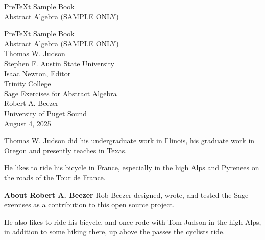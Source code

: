 \documentclass[oneside,10pt,]{book}
\newcommand{\titlepagefont}{\relax}
\numberwithin{equation}{section}
\begin{document}
\raggedbottom
\setcounter{page}{0}%
%
\frontmatter
\thispagestyle{empty}
{\titlepagefont\centering
\vspace*{0.28\textheight}
{\Huge PreTeXt Sample Book}\\[2\baselineskip]
{\LARGE Abstract Algebra (SAMPLE ONLY)}\\
}
\clearpage
\thispagestyle{empty}
{\titlepagefont\centering
\vspace*{0.14\textheight}
{\Huge PreTeXt Sample Book}\\[\baselineskip]
{\LARGE Abstract Algebra (SAMPLE ONLY)}\\[3\baselineskip]
{\Large Thomas W. Judson}\\[0.5\baselineskip]
{\Large Stephen F. Austin State University}\\[3\baselineskip]
{\Large Isaac Newton, Editor}\\[0.5\baselineskip]
{\Large Trinity College}\\[3\baselineskip]
{\Large Sage Exercises for Abstract Algebra}\\[0.5\baselineskip]
{\normalsize Robert A. Beezer}\\[0.25\baselineskip]
University of Puget Sound\\
[3\baselineskip]
{\Large August 4, 2025}\\}
\clearpage
\thispagestyle{empty}
\hypertarget{front-colophon}{}\noindent
Thomas W. Judson did his undergraduate work in Illinois, his graduate work in Oregon and presently teaches in Texas.%
\par
He likes to ride his bicycle in France, especially in the high Alps and Pyrenees on the roads of the Tour de France.%
\par
\bigskip\noindent\textbf{About Robert A. Beezer}\space\space
Rob Beezer designed, wrote, and tested the Sage exercises as a contribution to this open source project.%
\par
He also likes to ride his bicycle, and once rode with Tom Judson in the high Alps, in addition to some hiking there, up above the passes the cyclists ride.%
\par
\end{document}
